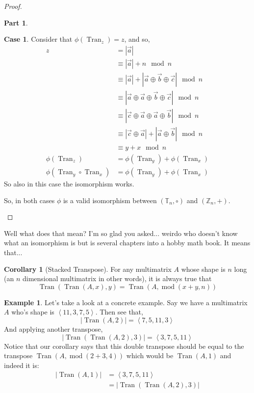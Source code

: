 \documentclass[12pt]{book}
\theoremstyle{plain}
\theoremstyle{definition}
\newtheorem{corollary}{Corollary}[theorem]
\newtheorem{example}{Example}[chapter]
\theoremstyle{ppart}
\newtheorem{ppart}{Part}
\theoremstyle{case}
\newtheorem{case}{Case}
\theoremstyle{solution}
\DeclareMathOperator{\Tran}{Tran}
\DeclareMathOperator{\remainder}{mod}
\begin{document}
\begin{proof}
\begin{ppart}
\begin{case}
Consider that $\phi(\Tran_z) = z$, and so,
\begin{align*}
  z
  &= |\vec{a}| \\
  &\equiv |\vec{a}| + n \mod n \\
  &\equiv |\vec{a}| + |\vec{a} \oplus \vec{b} \oplus \vec{c}| \mod n \\
  &\equiv |\vec{a} \oplus \vec{a} \oplus \vec{b} \oplus \vec{c}| \mod n \\
  &\equiv |\vec{c} \oplus \vec{a} \oplus \vec{a} \oplus \vec{b}| \mod n \\
  &\equiv |\vec{c} \oplus \vec{a}| + |\vec{a} \oplus \vec{b}| \mod n \\
  &\equiv y + x \mod n \\
  \phi(\Tran_z) &= \phi(\Tran_y) + \phi(\Tran_x) \\
  \phi(\Tran_y \circ \Tran_x) &= \phi(\Tran_y) + \phi(\Tran_x)
\end{align*}
So also in this case the isomorphism works.
\end{case}

So, in both cases $\phi$ is a valid isomorphism between $(\mathbb{T}_n, \circ)$
and $(\mathbb{Z}_n, +)$.
\end{ppart}
\end{proof}

Well what does that mean? I'm so glad you asked... weirdo who doesn't know what
an isomorphism is but is several chapters into a hobby math book. It means that...

\begin{corollary}[Stacked Transpose]
For any multimatrix $A$ whose shape is $n$ long (an $n$ dimensional multimatrix
in other words), it is always true that
\[ \Tran(\Tran(A, x),y) = \Tran(A, \remainder(x+y,n)) \]
\end{corollary}

\begin{example}
Let's take a look at a concrete example. Say we have a
multimatrix $A$ who's shape is $\left<11, 3, 7, 5\right>$. 
Then see that,
\[ |\Tran(A, 2)| = \left<7, 5, 11, 3\right> \]
And applying another transpose,
\[ |\Tran(\Tran(A, 2), 3)| = \left<3, 7, 5, 11\right> \]
Notice that our corollary says that this double transpose should be
equal to the transpose $\Tran(A, \remainder(2+3, 4))$ which would
be $\Tran(A, 1)$ and indeed it is:
\begin{align*}
  |\Tran(A, 1)|
  &= \left<3, 7, 5, 11\right> \\
  &= |\Tran(\Tran(A, 2), 3)|
\end{align*}
\end{example}
\end{document}
